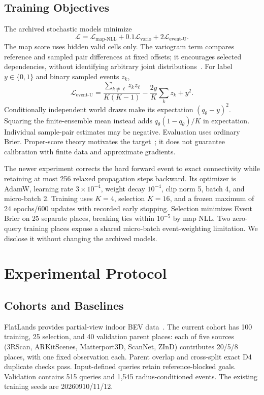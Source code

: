 \documentclass[conference,letterpaper,10pt]{IEEEtran}
\begin{document}
\subsection{Training Objectives}
The archived stochastic models minimize
\begin{equation}
 \mathcal L=\mathcal L_{\mathrm{map\text{-}NLL}}+0.1\mathcal L_{\mathrm{vario}}+2\mathcal L_{\mathrm{event\text{-}U}}.
\end{equation}
The map score uses hidden valid cells only. The variogram term compares reference and sampled pair differences at fixed offsets; it encourages selected dependencies, without identifying arbitrary joint distributions~\cite{scheuerer2015variogram}. For label $y\in\{0,1\}$ and binary sampled events $z_k$,
\begin{equation}
 \mathcal L_{\mathrm{event\text{-}U}}=
 \frac{\sum_{k\neq\ell}z_kz_\ell}{K(K-1)}-\frac{2y}{K}\sum_kz_k+y^2.
\end{equation}
Conditionally independent world draws make its expectation $(q_\theta-y)^2$. Squaring the finite-ensemble mean instead adds $q_\theta(1-q_\theta)/K$ in expectation. Individual sample-pair estimates may be negative. Evaluation uses ordinary Brier. Proper-score theory motivates the target~\cite{gneiting2007proper}; it does not guarantee calibration with finite data and approximate gradients.

The newer experiment corrects the hard forward event to exact connectivity while retaining at most 256 relaxed propagation steps backward. Its optimizer is AdamW, learning rate $3\times10^{-4}$, weight decay $10^{-4}$, clip norm 5, batch 4, and micro-batch 2. Training uses $K=4$, selection $K=16$, and a frozen maximum of 24 epochs/600 updates with recorded early stopping. Selection minimizes Event Brier on 25 separate places, breaking ties within $10^{-5}$ by map NLL. Two zero-query training places expose a shared micro-batch event-weighting limitation. We disclose it without changing the archived models.

\section{Experimental Protocol}
\subsection{Cohorts and Baselines}
FlatLands provides partial-view indoor BEV data~\cite{bhattacharjee2026flatlands}. The current cohort has 100 training, 25 selection, and 40 validation parent places: each of five sources (3RScan, ARKitScenes, Matterport3D, ScanNet, ZInD) contributes 20/5/8 places, with one fixed observation each. Parent overlap and cross-split exact D4 duplicate checks pass. Input-defined queries retain reference-blocked goals. Validation contains 515 queries and 1,545 radius-conditioned events. The existing training seeds are 20260910/11/12.
\end{document}
